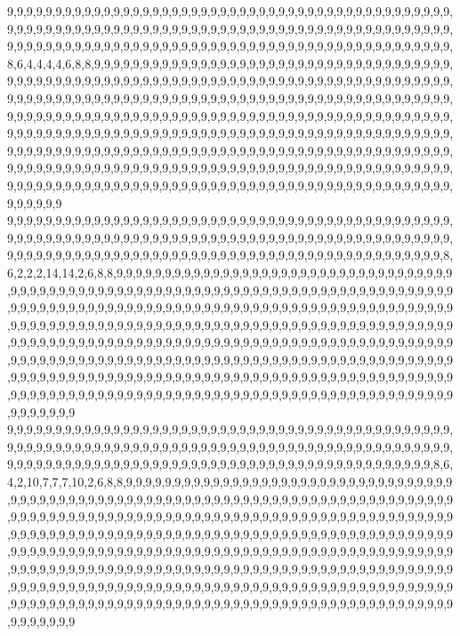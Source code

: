 9,9,9,9,9,9,9,9,9,9,9,9,9,9,9,9,9,9,9,9,9,9,9,9,9,9,9,9,9,9,9,9,9,9,9,9,9,9,9,9,9,9,9,9,9,9,9,9,9,9,9,9,9,9,9,9,9,9,9,9,9,9,9,9,9,9,9,9,9,9,9,9,9,9,9,9,9,9,9,9,9,9,9,9,9,9,9,9,9,9,9,9,9,9,9,9,9,9,9,9,9,9,9,9,9,9,9,9,9,9,9,9,9,9,9,9,9,9,9,9,9,9,9,9,9,9,9,9,9,9,9,9,9,9,9,9,9,9,8,6,4,4,4,4,6,8,8,9,9,9,9,9,9,9,9,9,9,9,9,9,9,9,9,9,9,9,9,9,9,9,9,9,9,9,9,9,9,9,9,9,9,9,9,9,9,9,9,9,9,9,9,9,9,9,9,9,9,9,9,9,9,9,9,9,9,9,9,9,9,9,9,9,9,9,9,9,9,9,9,9,9,9,9,9,9,9,9,9,9,9,9,9,9,9,9,9,9,9,9,9,9,9,9,9,9,9,9,9,9,9,9,9,9,9,9,9,9,9,9,9,9,9,9,9,9,9,9,9,9,9,9,9,9,9,9,9,9,9,9,9,9,9,9,9,9,9,9,9,9,9,9,9,9,9,9,9,9,9,9,9,9,9,9,9,9,9,9,9,9,9,9,9,9,9,9,9,9,9,9,9,9,9,9,9,9,9,9,9,9,9,9,9,9,9,9,9,9,9,9,9,9,9,9,9,9,9,9,9,9,9,9,9,9,9,9,9,9,9,9,9,9,9,9,9,9,9,9,9,9,9,9,9,9,9,9,9,9,9,9,9,9,9,9,9,9,9,9,9,9,9,9,9,9,9,9,9,9,9,9,9,9,9,9,9,9,9,9,9,9,9,9,9,9,9,9,9,9,9,9,9,9,9,9,9,9,9,9,9,9,9,9,9,9,9,9,9,9,9,9,9,9,9,9,9,9,9,9,9,9,9,9,9,9,9,9,9,9,9,9,9,9,9,9,9,9,9,9,9,9,9,9,9,9,9,9,9,9,9,9,9,9,9,9,9,9,9,9,9,9,9,9,9,9,9,9,9,9,9,9,9,9,9,9,9,9,9,9,9,9,9,9,9
9,9,9,9,9,9,9,9,9,9,9,9,9,9,9,9,9,9,9,9,9,9,9,9,9,9,9,9,9,9,9,9,9,9,9,9,9,9,9,9,9,9,9,9,9,9,9,9,9,9,9,9,9,9,9,9,9,9,9,9,9,9,9,9,9,9,9,9,9,9,9,9,9,9,9,9,9,9,9,9,9,9,9,9,9,9,9,9,9,9,9,9,9,9,9,9,9,9,9,9,9,9,9,9,9,9,9,9,9,9,9,9,9,9,9,9,9,9,9,9,9,9,9,9,9,9,9,9,9,9,9,9,9,9,9,9,9,8,6,2,2,2,14,14,2,6,8,8,9,9,9,9,9,9,9,9,9,9,9,9,9,9,9,9,9,9,9,9,9,9,9,9,9,9,9,9,9,9,9,9,9,9,9,9,9,9,9,9,9,9,9,9,9,9,9,9,9,9,9,9,9,9,9,9,9,9,9,9,9,9,9,9,9,9,9,9,9,9,9,9,9,9,9,9,9,9,9,9,9,9,9,9,9,9,9,9,9,9,9,9,9,9,9,9,9,9,9,9,9,9,9,9,9,9,9,9,9,9,9,9,9,9,9,9,9,9,9,9,9,9,9,9,9,9,9,9,9,9,9,9,9,9,9,9,9,9,9,9,9,9,9,9,9,9,9,9,9,9,9,9,9,9,9,9,9,9,9,9,9,9,9,9,9,9,9,9,9,9,9,9,9,9,9,9,9,9,9,9,9,9,9,9,9,9,9,9,9,9,9,9,9,9,9,9,9,9,9,9,9,9,9,9,9,9,9,9,9,9,9,9,9,9,9,9,9,9,9,9,9,9,9,9,9,9,9,9,9,9,9,9,9,9,9,9,9,9,9,9,9,9,9,9,9,9,9,9,9,9,9,9,9,9,9,9,9,9,9,9,9,9,9,9,9,9,9,9,9,9,9,9,9,9,9,9,9,9,9,9,9,9,9,9,9,9,9,9,9,9,9,9,9,9,9,9,9,9,9,9,9,9,9,9,9,9,9,9,9,9,9,9,9,9,9,9,9,9,9,9,9,9,9,9,9,9,9,9,9,9,9,9,9,9,9,9,9,9,9,9,9,9,9,9,9,9,9,9,9,9,9,9,9,9,9,9,9,9,9,9,9,9,9,9
9,9,9,9,9,9,9,9,9,9,9,9,9,9,9,9,9,9,9,9,9,9,9,9,9,9,9,9,9,9,9,9,9,9,9,9,9,9,9,9,9,9,9,9,9,9,9,9,9,9,9,9,9,9,9,9,9,9,9,9,9,9,9,9,9,9,9,9,9,9,9,9,9,9,9,9,9,9,9,9,9,9,9,9,9,9,9,9,9,9,9,9,9,9,9,9,9,9,9,9,9,9,9,9,9,9,9,9,9,9,9,9,9,9,9,9,9,9,9,9,9,9,9,9,9,9,9,9,9,9,9,9,9,9,9,9,8,6,4,2,10,7,7,7,10,2,6,8,8,9,9,9,9,9,9,9,9,9,9,9,9,9,9,9,9,9,9,9,9,9,9,9,9,9,9,9,9,9,9,9,9,9,9,9,9,9,9,9,9,9,9,9,9,9,9,9,9,9,9,9,9,9,9,9,9,9,9,9,9,9,9,9,9,9,9,9,9,9,9,9,9,9,9,9,9,9,9,9,9,9,9,9,9,9,9,9,9,9,9,9,9,9,9,9,9,9,9,9,9,9,9,9,9,9,9,9,9,9,9,9,9,9,9,9,9,9,9,9,9,9,9,9,9,9,9,9,9,9,9,9,9,9,9,9,9,9,9,9,9,9,9,9,9,9,9,9,9,9,9,9,9,9,9,9,9,9,9,9,9,9,9,9,9,9,9,9,9,9,9,9,9,9,9,9,9,9,9,9,9,9,9,9,9,9,9,9,9,9,9,9,9,9,9,9,9,9,9,9,9,9,9,9,9,9,9,9,9,9,9,9,9,9,9,9,9,9,9,9,9,9,9,9,9,9,9,9,9,9,9,9,9,9,9,9,9,9,9,9,9,9,9,9,9,9,9,9,9,9,9,9,9,9,9,9,9,9,9,9,9,9,9,9,9,9,9,9,9,9,9,9,9,9,9,9,9,9,9,9,9,9,9,9,9,9,9,9,9,9,9,9,9,9,9,9,9,9,9,9,9,9,9,9,9,9,9,9,9,9,9,9,9,9,9,9,9,9,9,9,9,9,9,9,9,9,9,9,9,9,9,9,9,9,9,9,9,9,9,9,9,9,9,9,9,9,9,9,9,9,9,9,9,9,9,9,9,9,9,9,9,9,9,9
